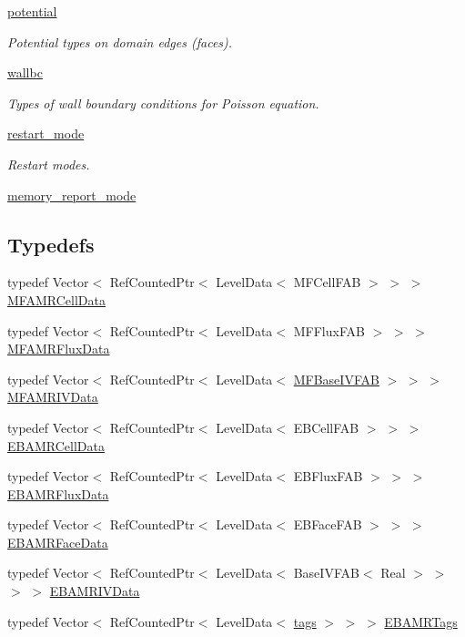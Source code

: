\begin{DoxyCompactItemize}
 \hyperlink{namespacepotential}{potential}
\begin{DoxyCompactList}\small\item\em Potential types on domain edges (faces). \end{DoxyCompactList}\item 
 \hyperlink{namespacewallbc}{wallbc}
\begin{DoxyCompactList}\small\item\em Types of wall boundary conditions for Poisson equation. \end{DoxyCompactList}\item 
 \hyperlink{namespacerestart__mode}{restart\+\_\+mode}
\begin{DoxyCompactList}\small\item\em Restart modes. \end{DoxyCompactList}\item 
 \hyperlink{namespacememory__report__mode}{memory\+\_\+report\+\_\+mode}
\end{DoxyCompactItemize}
\subsection*{Typedefs}
\begin{DoxyCompactItemize}
\item 
typedef Vector$<$ Ref\+Counted\+Ptr$<$ Level\+Data$<$ M\+F\+Cell\+F\+AB $>$ $>$ $>$ \hyperlink{type__definitions_8H_aced885351d40daa466564acbee4042d3}{M\+F\+A\+M\+R\+Cell\+Data}
\item 
typedef Vector$<$ Ref\+Counted\+Ptr$<$ Level\+Data$<$ M\+F\+Flux\+F\+AB $>$ $>$ $>$ \hyperlink{type__definitions_8H_a4033d82364b7e6655b58257749d7881f}{M\+F\+A\+M\+R\+Flux\+Data}
\item 
typedef Vector$<$ Ref\+Counted\+Ptr$<$ Level\+Data$<$ \hyperlink{classMFBaseIVFAB}{M\+F\+Base\+I\+V\+F\+AB} $>$ $>$ $>$ \hyperlink{type__definitions_8H_a559707b00625e419df1a59d9501220de}{M\+F\+A\+M\+R\+I\+V\+Data}
\item 
typedef Vector$<$ Ref\+Counted\+Ptr$<$ Level\+Data$<$ E\+B\+Cell\+F\+AB $>$ $>$ $>$ \hyperlink{type__definitions_8H_a7e610f301989e5e07781c5e338bdb7c3}{E\+B\+A\+M\+R\+Cell\+Data}
\item 
typedef Vector$<$ Ref\+Counted\+Ptr$<$ Level\+Data$<$ E\+B\+Flux\+F\+AB $>$ $>$ $>$ \hyperlink{type__definitions_8H_aadad278b2e5d3d4abcf9032f90ba78c3}{E\+B\+A\+M\+R\+Flux\+Data}
\item 
typedef Vector$<$ Ref\+Counted\+Ptr$<$ Level\+Data$<$ E\+B\+Face\+F\+AB $>$ $>$ $>$ \hyperlink{type__definitions_8H_a4f1866267c9e1b765c485183872dcfbc}{E\+B\+A\+M\+R\+Face\+Data}
\item 
typedef Vector$<$ Ref\+Counted\+Ptr$<$ Level\+Data$<$ Base\+I\+V\+F\+AB$<$ Real $>$ $>$ $>$ $>$ \hyperlink{type__definitions_8H_a6b8fa905d55cbb491b52180386f0e0c1}{E\+B\+A\+M\+R\+I\+V\+Data}
\item 
typedef Vector$<$ Ref\+Counted\+Ptr$<$ Level\+Data$<$ \hyperlink{classtags}{tags} $>$ $>$ $>$ \hyperlink{type__definitions_8H_a4eb540da9eb275c3e4225830ae526113}{E\+B\+A\+M\+R\+Tags}
\end{DoxyCompactItemize}
